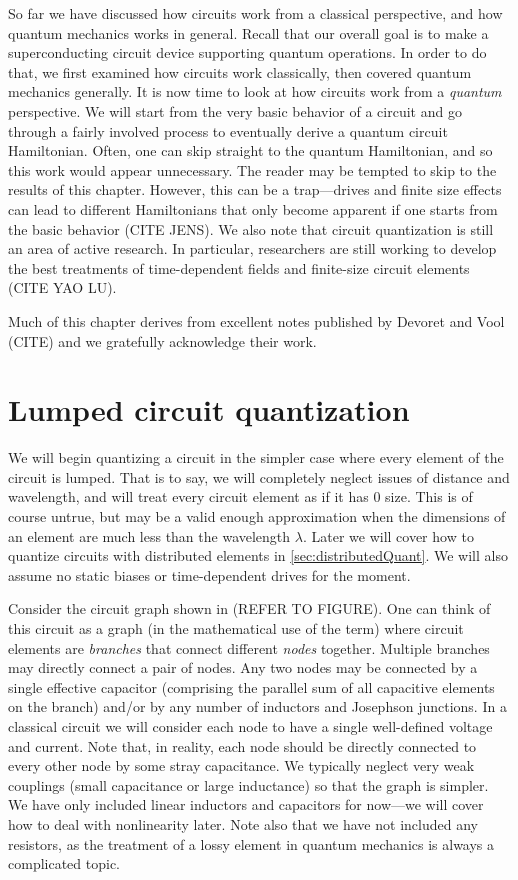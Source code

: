 \label{ch:circuitquant}
So far we have discussed how circuits work from a classical perspective, and how quantum mechanics works in general. Recall that our overall goal is to make a superconducting circuit device supporting quantum operations. In order to do that, we first examined how circuits work classically, then covered quantum mechanics generally. It is now time to look at how circuits work from a \textit{quantum} perspective. We will start from the very basic behavior of a circuit and go through a fairly involved process to eventually derive a quantum circuit Hamiltonian. Often, one can skip straight to the quantum Hamiltonian, and so this work would appear unnecessary. The reader may be tempted to skip to the results of this chapter. However, this can be a trap---drives and finite size effects can lead to different Hamiltonians that only become apparent if one starts from the basic behavior (CITE JENS). We also note that circuit quantization is still an area of active research. In particular, researchers are still working to develop the best treatments of time-dependent fields and finite-size circuit elements (CITE YAO LU).

Much of this chapter derives from excellent notes published by Devoret and Vool (CITE) and we gratefully acknowledge their work.

\section{Lumped circuit quantization}
We will begin quantizing a circuit in the simpler case where every element of the circuit is lumped. That is to say, we will completely neglect issues of distance and wavelength, and will treat every circuit element as if it has 0 size. This is of course untrue, but may be a valid enough approximation when the dimensions of an element are much less than the wavelength $\lambda$. Later we will cover how to quantize circuits with distributed elements in \cref{sec:distributedQuant}. We will also assume no static biases or time-dependent drives for the moment.

Consider the circuit graph shown in (REFER TO FIGURE). One can think of this circuit as a graph (in the mathematical use of the term) where circuit elements are \textit{branches} that connect different \textit{nodes} together. Multiple branches may directly connect a pair of nodes. Any two nodes may be connected by a single effective capacitor (comprising the parallel sum of all capacitive elements on the branch) and/or by any number of inductors and Josephson junctions. In a classical circuit we will consider each node to have a single well-defined voltage and current. Note that, in reality, each node should be directly connected to every other node by some stray capacitance. We typically neglect very weak couplings (small capacitance or large inductance) so that the graph is simpler. We have only included linear inductors and capacitors for now---we will cover how to deal with nonlinearity later. Note also that we have not included any resistors, as the treatment of a lossy element in quantum mechanics is always a complicated topic. 

